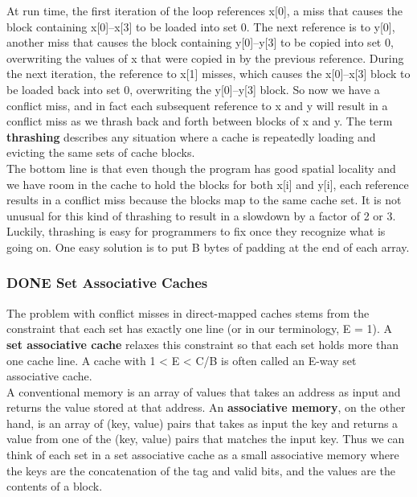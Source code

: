 \documentclass[11pt]{article}
\begin{document}
\begin{enumerate}
At run time, the first iteration of the loop references x[0], a miss that causes the block containing x[0]–x[3] to be loaded into set 0. The next reference is to y[0], another miss that causes the block containing y[0]–y[3] to be copied into set 0, overwriting the values of x that were copied in by the previous reference. During the next iteration, the reference to x[1] misses, which causes the x[0]–x[3] block to be loaded back into set 0, overwriting the y[0]–y[3] block. So now we have a conflict miss, and in fact each subsequent reference to x and y will result in a conflict miss as we thrash back and forth between blocks of x and y. The term \textbf{thrashing} describes any situation where a cache is repeatedly loading and evicting the same sets of cache blocks.\\

The bottom line is that even though the program has good spatial locality and we have room in the cache to hold the blocks for both x[i] and y[i], each reference results in a conflict miss because the blocks map to the same cache set. It is not unusual for this kind of thrashing to result in a slowdown by a factor of 2 or 3.\\


Luckily, thrashing is easy for programmers to fix once they recognize what is going on. One easy solution is to put B bytes of padding at the end of each array.\\
\end{enumerate}


\subsubsection{{\bfseries\sffamily DONE} Set Associative Caches}
\label{sec:orgc063dc3}
The problem with conflict misses in direct-mapped caches stems from the constraint that each set has exactly one line (or in our terminology, E = 1). A \textbf{set associative cache} relaxes this constraint so that each set holds more than one cache line. A cache with 1 < E < C/B is often called an E-way set associative cache.\\

A conventional memory is an array of values that takes an address as input and returns the value stored at that address. An \textbf{associative memory}, on the other hand, is an array of (key, value) pairs that takes as input the key and returns a value from one of the (key, value) pairs that matches the input key. Thus we can think of each set in a set associative cache as a small associative memory where the keys are the concatenation of the tag and valid bits, and the values are the contents of a block.\\
\end{document}

